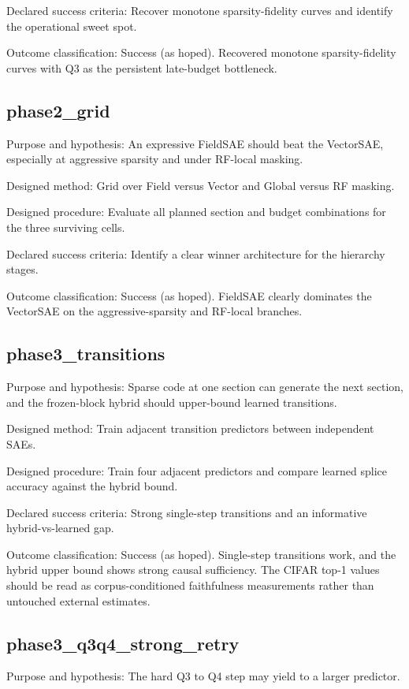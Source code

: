 \documentclass[11pt]{article}
\begin{document}
Declared success criteria: Recover monotone sparsity-fidelity curves and identify the operational sweet spot.


Outcome classification: Success (as hoped). Recovered monotone sparsity-fidelity curves with Q3 as the persistent late-budget bottleneck.


\subsection{phase2\_grid}
Purpose and hypothesis: An expressive FieldSAE should beat the VectorSAE, especially at aggressive sparsity and under RF-local masking.


Designed method: Grid over Field versus Vector and Global versus RF masking.


Designed procedure: Evaluate all planned section and budget combinations for the three surviving cells.


Declared success criteria: Identify a clear winner architecture for the hierarchy stages.


Outcome classification: Success (as hoped). FieldSAE clearly dominates the VectorSAE on the aggressive-sparsity and RF-local branches.


\subsection{phase3\_transitions}
Purpose and hypothesis: Sparse code at one section can generate the next section, and the frozen-block hybrid should upper-bound learned transitions.


Designed method: Train adjacent transition predictors between independent SAEs.


Designed procedure: Train four adjacent predictors and compare learned splice accuracy against the hybrid bound.


Declared success criteria: Strong single-step transitions and an informative hybrid-vs-learned gap.


Outcome classification: Success (as hoped). Single-step transitions work, and the hybrid upper bound shows strong causal sufficiency. The CIFAR top-1 values should be read as corpus-conditioned faithfulness measurements rather than untouched external estimates.


\subsection{phase3\_q3q4\_strong\_retry}
Purpose and hypothesis: The hard Q3 to Q4 step may yield to a larger predictor.
\end{document}

